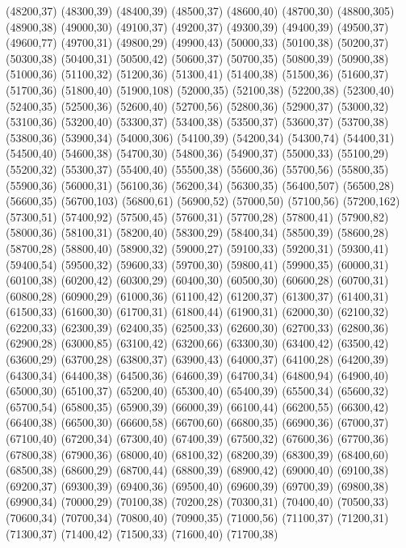 (48200,37)
(48300,39)
(48400,39)
(48500,37)
(48600,40)
(48700,30)
(48800,305)
(48900,38)
(49000,30)
(49100,37)
(49200,37)
(49300,39)
(49400,39)
(49500,37)
(49600,77)
(49700,31)
(49800,29)
(49900,43)
(50000,33)
(50100,38)
(50200,37)
(50300,38)
(50400,31)
(50500,42)
(50600,37)
(50700,35)
(50800,39)
(50900,38)
(51000,36)
(51100,32)
(51200,36)
(51300,41)
(51400,38)
(51500,36)
(51600,37)
(51700,36)
(51800,40)
(51900,108)
(52000,35)
(52100,38)
(52200,38)
(52300,40)
(52400,35)
(52500,36)
(52600,40)
(52700,56)
(52800,36)
(52900,37)
(53000,32)
(53100,36)
(53200,40)
(53300,37)
(53400,38)
(53500,37)
(53600,37)
(53700,38)
(53800,36)
(53900,34)
(54000,306)
(54100,39)
(54200,34)
(54300,74)
(54400,31)
(54500,40)
(54600,38)
(54700,30)
(54800,36)
(54900,37)
(55000,33)
(55100,29)
(55200,32)
(55300,37)
(55400,40)
(55500,38)
(55600,36)
(55700,56)
(55800,35)
(55900,36)
(56000,31)
(56100,36)
(56200,34)
(56300,35)
(56400,507)
(56500,28)
(56600,35)
(56700,103)
(56800,61)
(56900,52)
(57000,50)
(57100,56)
(57200,162)
(57300,51)
(57400,92)
(57500,45)
(57600,31)
(57700,28)
(57800,41)
(57900,82)
(58000,36)
(58100,31)
(58200,40)
(58300,29)
(58400,34)
(58500,39)
(58600,28)
(58700,28)
(58800,40)
(58900,32)
(59000,27)
(59100,33)
(59200,31)
(59300,41)
(59400,54)
(59500,32)
(59600,33)
(59700,30)
(59800,41)
(59900,35)
(60000,31)
(60100,38)
(60200,42)
(60300,29)
(60400,30)
(60500,30)
(60600,28)
(60700,31)
(60800,28)
(60900,29)
(61000,36)
(61100,42)
(61200,37)
(61300,37)
(61400,31)
(61500,33)
(61600,30)
(61700,31)
(61800,44)
(61900,31)
(62000,30)
(62100,32)
(62200,33)
(62300,39)
(62400,35)
(62500,33)
(62600,30)
(62700,33)
(62800,36)
(62900,28)
(63000,85)
(63100,42)
(63200,66)
(63300,30)
(63400,42)
(63500,42)
(63600,29)
(63700,28)
(63800,37)
(63900,43)
(64000,37)
(64100,28)
(64200,39)
(64300,34)
(64400,38)
(64500,36)
(64600,39)
(64700,34)
(64800,94)
(64900,40)
(65000,30)
(65100,37)
(65200,40)
(65300,40)
(65400,39)
(65500,34)
(65600,32)
(65700,54)
(65800,35)
(65900,39)
(66000,39)
(66100,44)
(66200,55)
(66300,42)
(66400,38)
(66500,30)
(66600,58)
(66700,60)
(66800,35)
(66900,36)
(67000,37)
(67100,40)
(67200,34)
(67300,40)
(67400,39)
(67500,32)
(67600,36)
(67700,36)
(67800,38)
(67900,36)
(68000,40)
(68100,32)
(68200,39)
(68300,39)
(68400,60)
(68500,38)
(68600,29)
(68700,44)
(68800,39)
(68900,42)
(69000,40)
(69100,38)
(69200,37)
(69300,39)
(69400,36)
(69500,40)
(69600,39)
(69700,39)
(69800,38)
(69900,34)
(70000,29)
(70100,38)
(70200,28)
(70300,31)
(70400,40)
(70500,33)
(70600,34)
(70700,34)
(70800,40)
(70900,35)
(71000,56)
(71100,37)
(71200,31)
(71300,37)
(71400,42)
(71500,33)
(71600,40)
(71700,38)
